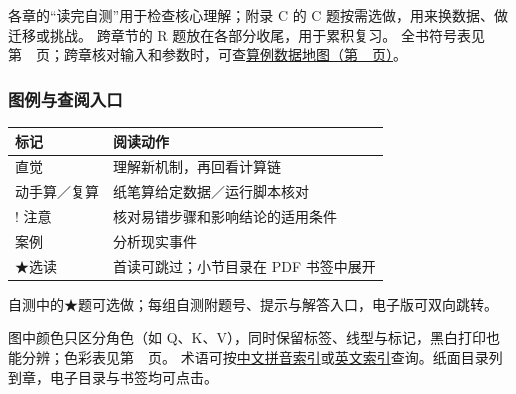 各章的“读完自测”用于检查核心理解；附录 C 的 C 题按需选做，用来换数据、做迁移或挑战。
跨章节的 R 题放在各部分收尾，用于累积复习。
全书符号表见第~\pageref*{app:symbols}~页；跨章核对输入和参数时，可查\hyperref[app:data-map]{算例数据地图（第~\pageref*{app:data-map}~页）}。

\subsubsection*{图例与查阅入口}
\noindent\begin{tabularx}{\linewidth}{@{}p{34mm}X@{}}
\toprule
标记 & 阅读动作\\\midrule
直觉 & 理解新机制，再回看计算链\\
动手算／复算 & 纸笔算给定数据／运行脚本核对\\
! 注意 & 核对易错步骤和影响结论的适用条件\\
案例 & 分析现实事件\\
{\symboliconfont ★}选读 & 首读可跳过；小节目录在 PDF 书签中展开\\
\bottomrule
\end{tabularx}\par
自测中的{\symboliconfont ★}题可选做；每组自测附题号、提示与解答入口，电子版可双向跳转。

图中颜色只区分角色（如 Q、K、V），同时保留标签、线型与标记，黑白打印也能分辨；色彩表见第~\pageref*{app:color-semantics}~页。
术语可按\hyperref[app:chinese-index]{中文拼音索引}或\hyperref[app:english-index]{英文索引}查询。纸面目录列到章，电子目录与书签均可点击。

\endgroup
